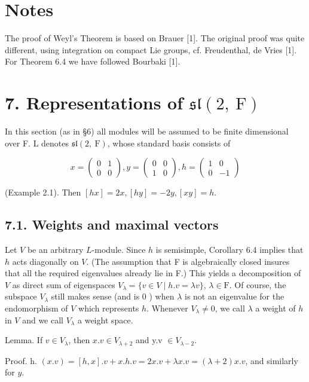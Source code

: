 \documentclass[10pt]{article}
\begin{document}
\section*{Notes}
The proof of Weyl's Theorem is based on Brauer [1]. The original proof was quite different, using integration on compact Lie groups, cf. Freudenthal, de Vries [1]. For Theorem 6.4 we have followed Bourbaki [1].

\section*{7. Representations of $\mathfrak{s l}(2, \mathrm{~F})$}
In this section (as in §6) all modules will be assumed to be finite dimensional over F. L denotes $\mathfrak{s l}(2, \mathrm{~F})$, whose standard basis consists of

$$
x=\left(\begin{array}{ll}
0 & 1 \\
0 & 0
\end{array}\right), y=\left(\begin{array}{ll}
0 & 0 \\
1 & 0
\end{array}\right), h=\left(\begin{array}{rr}
1 & 0 \\
0 & -1
\end{array}\right)
$$

(Example 2.1). Then $[h x]=2 x,[h y]=-2 y,[x y]=h$.

\subsection*{7.1. Weights and maximal vectors}
Let $V$ be an arbitrary $L$-module. Since $h$ is semisimple, Corollary 6.4 implies that $h$ acts diagonally on $V$. (The assumption that F is algebraically closed insures that all the required eigenvalues already lie in F.) This yields a decomposition of $V$ as direct sum of eigenspaces $V_{\lambda}=\{v \in V \mid h . v=\lambda v\}$, $\lambda \in \mathrm{F}$. Of course, the subspace $V_{\lambda}$ still makes sense (and is 0 ) when $\lambda$ is not an eigenvalue for the endomorphism of $V$ which represents $h$. Whenever $V_{\lambda} \neq 0$, we call $\lambda$ a weight of $h$ in $V$ and we call $V_{\lambda}$ a weight space.

Lemma. If $v \in V_{\lambda}$, then $x . v \in V_{\lambda+2}$ and y.v $\in V_{\lambda-2}$.

Proof. h. $(x . v)=[h, x] . v+x . h . v=2 x . v+\lambda x . v=(\lambda+2) x . v$, and similarly for $y$.
\end{document}
